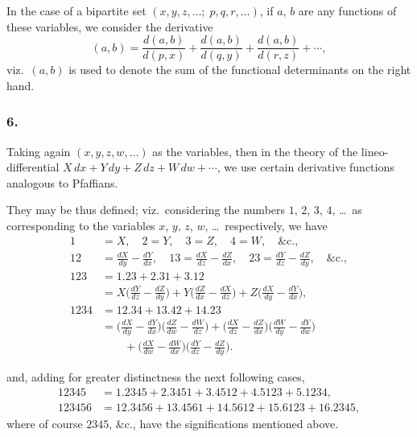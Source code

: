 \documentclass[11pt,a4paper]{book}
\begin{document}
In the case of a bipartite set $(x, y, z, \ldots;\; p, q, r, \ldots)$, if $a$, $b$ are any functions of these variables, we consider the derivative
\[
(a, b) = \frac{d(a, b)}{d(p, x)} + \frac{d(a, b)}{d(q, y)} + \frac{d(a, b)}{d(r, z)} + \cdots,
\]
viz.~$(a, b)$ is used to denote the sum of the functional determinants on the right hand.

\subsubsection*{6.}

Taking again $(x, y, z, w, \ldots)$ as the variables, then in the theory of the lineo-differential $X\,dx + Y\,dy + Z\,dz + W\,dw + \cdots$, we use certain derivative functions analogous to Pfaffians.

They may be thus defined; viz.~considering the numbers $1$, $2$, $3$, $4$, \ldots\ as corresponding to the variables $x$, $y$, $z$, $w$, \ldots\ respectively, we have
\begin{align*}
1 &= X, \quad 2 = Y, \quad 3 = Z, \quad 4 = W, \quad \&\text{c.}, \\
12 &= \frac{dX}{dy} - \frac{dY}{dx}, \quad
13 = \frac{dX}{dz} - \frac{dZ}{dx}, \quad
23 = \frac{dY}{dz} - \frac{dZ}{dy}, \quad \&\text{c.}, \\
123 &= 1.23 + 2.31 + 3.12 \\
&= X\biggl(\frac{dY}{dz} - \frac{dZ}{dy}\biggr) + Y\biggl(\frac{dZ}{dx} - \frac{dX}{dz}\biggr) + Z\biggl(\frac{dX}{dy} - \frac{dY}{dx}\biggr), \\
1234 &= 12.34 + 13.42 + 14.23 \\
&= \biggl(\frac{dX}{dy} - \frac{dY}{dx}\biggr)\biggl(\frac{dZ}{dw} - \frac{dW}{dz}\biggr) + \biggl(\frac{dX}{dz} - \frac{dZ}{dx}\biggr)\biggl(\frac{dW}{dy} - \frac{dY}{dw}\biggr) \\
&\qquad + \biggl(\frac{dX}{dw} - \frac{dW}{dx}\biggr)\biggl(\frac{dY}{dz} - \frac{dZ}{dy}\biggr).
\end{align*}

\newpage
\setcounter{page}{117}

and, adding for greater distinctness the next following cases,
\begin{align*}
12345 &= 1.2345 + 2.3451 + 3.4512 + 4.5123 + 5.1234, \\
123456 &= 12.3456 + 13.4561 + 14.5612 + 15.6123 + 16.2345,
\end{align*}
where of course $2345$, \&c., have the significations mentioned above.
\end{document}
